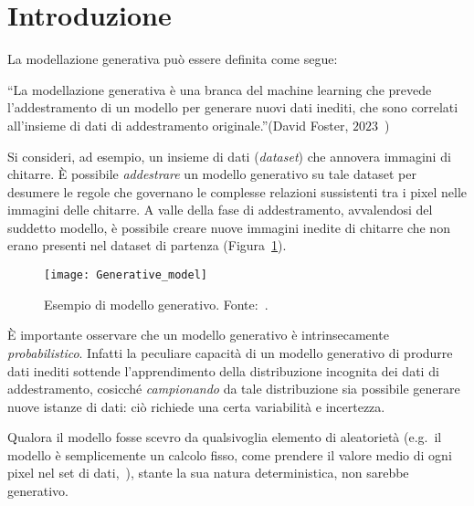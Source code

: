 \section{Introduzione}

La modellazione generativa può essere definita come segue:
\begin{quoting}
        “La modellazione generativa è una branca del machine learning che prevede l'addestramento 
         di un modello per generare nuovi dati inediti, che sono correlati all'insieme di dati 
         di addestramento originale.”(David Foster, $2023$~\cite{fosterGenerativeDeepLearning2023})
\end{quoting}
    

\noindent Si consideri, ad esempio, un insieme di dati (\emph{dataset}) che annovera immagini di chitarre. È possibile \emph{addestrare} un modello generativo su tale dataset
per desumere le regole che governano le complesse relazioni sussistenti tra i pixel nelle immagini delle chitarre.
A valle della fase di addestramento, avvalendosi del suddetto modello, è possibile creare nuove immagini inedite di chitarre
che non erano presenti nel dataset di partenza (Figura~\ref{fig:gen_model}).



\begin{figure}
        \centering
        \texttt{[image: Generative\_model]}
        \caption{Esempio di modello generativo. Fonte:~\cite{fosterGenerativeDeepLearning2023}.}
        \label{fig:gen_model}
\end{figure}



\noindent È importante osservare che un modello generativo è intrinsecamente \emph{probabilistico}. Infatti 
la peculiare capacità di un modello generativo di produrre dati inediti
sottende l'apprendimento della distribuzione incognita dei dati di addestramento, 
cosicché \emph{campionando} da tale distribuzione sia possibile generare nuove istanze di dati: ciò richiede una certa variabilità e incertezza.


Qualora il modello fosse scevro da qualsivoglia elemento di aleatorietà 
(e.g.\ il modello è semplicemente un calcolo fisso, come prendere il valore medio di ogni pixel nel set di dati,~\cite{fosterGenerativeDeepLearning2023}),
stante la sua natura deterministica, non sarebbe generativo.   